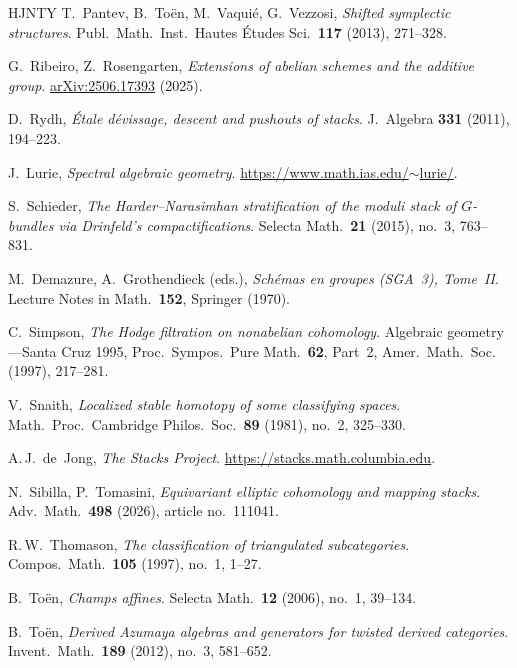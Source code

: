\documentclass[12pt, oneside]{amsart}
\newcommand\arXiv[1]{\href{http://arxiv.org/abs/#1}{arXiv:#1}}
\numberwithin{equation}{section}
\theoremstyle{remark}
\theoremstyle{plain}
\begin{document}
\begin{thebibliography}{HJNTY}
   T.~Pantev, B.~To\"en, M.~Vaqui\'e, G.~Vezzosi, \textit{Shifted symplectic structures}. Publ.\ Math.\ Inst.\ Hautes \'Etudes Sci.\ {\bf{117}} (2013), 271--328.

   G.~Ribeiro, Z.~Rosengarten, \textit{Extensions of abelian schemes and the additive group}. \arXiv{2506.17393} (2025).

   D.~Rydh, \textit{\'Etale d\'evissage, descent and pushouts of stacks}. J.\ Algebra {\bf{331}} (2011), 194--223.

   J.~Lurie, \textit{Spectral algebraic geometry}. \href{https://www.math.ias.edu/~lurie/}{https://www.math.ias.edu/$\sim$lurie/}.

   S.~Schieder, \textit{The Harder--Narasimhan stratification of the moduli stack of $G$-bundles via Drinfeld's compactifications}. Selecta Math.\ {\bf{21}} (2015), no.~3, 763--831.

   M.~Demazure, A.~Grothendieck (eds.), \textit{Sch\'emas en groupes (SGA~3), Tome~II}. Lecture Notes in Math.\ {\bf{152}}, Springer (1970).

   C.~Simpson, \textit{The Hodge filtration on nonabelian cohomology}. Algebraic geometry---Santa Cruz 1995, Proc.\ Sympos.\ Pure Math.\ {\bf{62}}, Part~2, Amer.\ Math.\ Soc. (1997), 217--281.

   V.~Snaith, \textit{Localized stable homotopy of some classifying spaces}. Math.\ Proc.\ Cambridge Philos.\ Soc.\ {\bf{89}} (1981), no.~2, 325--330.

   A.\,J.~de~Jong, \textit{The Stacks Project}. \href{https://stacks.math.columbia.edu}{https://stacks.math.columbia.edu}.

   N.~Sibilla, P.~Tomasini, \textit{Equivariant elliptic cohomology and mapping stacks}. Adv.\ Math.\ {\bf{498}} (2026), article no.~111041.

   R.\,W.~Thomason, \textit{The classification of triangulated subcategories}. Compos.\ Math.\ {\bf{105}} (1997), no.~1, 1--27.

   B.~To\"en, \textit{Champs affines}. Selecta Math.\ {\bf{12}} (2006), no.~1, 39--134.

   B.~To\"en, \textit{Derived Azumaya algebras and generators for twisted derived categories}. Invent.\ Math.\ {\bf{189}} (2012), no.~3, 581--652.


\end{thebibliography}
\end{document}

